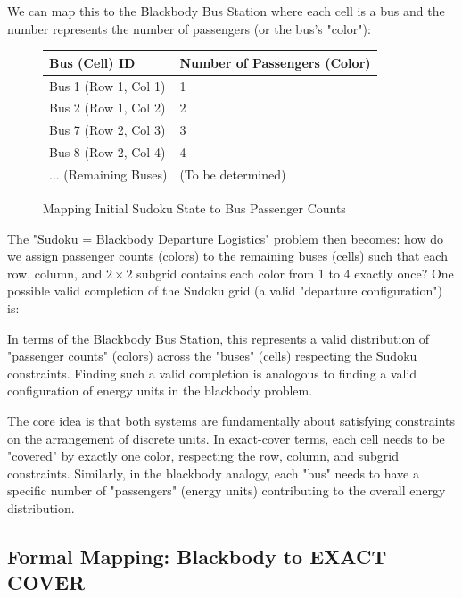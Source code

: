 \documentclass{report}
\begin{document}
We can map this to the Blackbody Bus Station where each cell is a bus and the number represents the number of passengers (or the bus's "color"):
\begin{figure}[H]
    \centering
    \begin{tabularx}{0.6\textwidth}{|>{\centering\arraybackslash}m{4cm}|m{5cm}|}
        \hline
        \textbf{Bus (Cell) ID} & \textbf{Number of Passengers (Color)} \\ \hline
        Bus 1 (Row 1, Col 1) & 1 \\ \hline
        Bus 2 (Row 1, Col 2) & 2 \\ \hline
        Bus 7 (Row 2, Col 3) & 3 \\ \hline
        Bus 8 (Row 2, Col 4) & 4 \\ \hline
        ... (Remaining Buses) &  (To be determined) \\ \hline
    \end{tabularx}
    \caption{Mapping Initial Sudoku State to Bus Passenger Counts}
    \label{fig:sudoku_to_bus}
\end{figure}



The "Sudoku = Blackbody Departure Logistics" problem then becomes: how do we assign passenger counts (colors) to the remaining buses (cells) such that each row, column, and \(2 \times 2\) subgrid contains each color from 1 to 4 exactly once? One possible valid completion of the Sudoku grid (a valid "departure configuration") is:

In terms of the Blackbody Bus Station, this represents a valid distribution of "passenger counts" (colors) across the "buses" (cells) respecting the Sudoku constraints. Finding such a valid completion is analogous to finding a valid configuration of energy units in the blackbody problem.

The core idea is that both systems are fundamentally about satisfying constraints on the arrangement of discrete units. In exact-cover terms, each cell needs to be "covered" by exactly one color, respecting the row, column, and subgrid constraints. Similarly, in the blackbody analogy, each "bus" needs to have a specific number of "passengers" (energy units) contributing to the overall energy distribution.

\subsection*{Formal Mapping: Blackbody to EXACT COVER}
\end{document}
